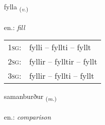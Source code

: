 \documentclass[frontgrid, backgrid]{flacards}\usepackage[]{graphicx}\usepackage[]{xcolor}
\begin{document}
\renewcommand{\flhead}{\vskip5pt \fboxsep=0pt {\small\bfseries\footnotesize Sagnorð | Verb}}
\renewcommand{\fcfoot}{\vskip5pt \fboxsep=0pt \hspace{2pt}{\small\bfseries\footnotesize 2K}}

\renewcommand{\blhead}{\vskip5pt {\small\bfseries\footnotesize Sagnorð | Verb }}
\renewcommand{\bcfoot}{\vskip5pt \hspace{2pt}{\small\bfseries\footnotesize 2K}}


{fylla \small{\textsubscript{(\textit{v.})}} \\[1ex] %
\textphonetic{[fɪtla]} \\
en.: \emph{fill} \\  [2ex]
\renewcommand*{\arraystretch}{0.8}
\begin{tabular}{p{1cm}l}
\textsc{1sg}: & fylli -- fyllti -- fyllt \\ 
\textsc{2sg}: & fyllir -- fylltir -- fyllt \\ 
\textsc{3sg}: & fyllir -- fyllti -- fyllt \\ 
\end{tabular}
}

\renewcommand{\flhead}{\vskip5pt \fboxsep=0pt {\small\bfseries\footnotesize Nafnorð | Noun}}
\renewcommand{\fcfoot}{\vskip5pt \fboxsep=0pt \hspace{2pt}{\small\bfseries\footnotesize 2K}}

\renewcommand{\blhead}{\vskip5pt {\small\bfseries\footnotesize Nafnorð | Noun }}
\renewcommand{\bcfoot}{\vskip5pt \hspace{2pt}{\small\bfseries\footnotesize 2K}}


{samanburður \small{\textsubscript{(\textit{m.})}} \\[1ex] %
\textphonetic{[saːmanpʏrðʏr]} \\
en.: \emph{comparison} \\  [2ex]
\renewcommand*{\arraystretch}{0.8}
}
\end{document}
